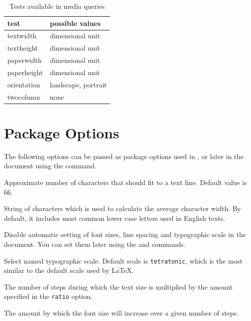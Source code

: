 \documentclass{ltxdoc}
\begin{document}
\begin{table}[htbp]
  \centering
  \begin{tabular}{ll}
    \toprule
    test & possible values \\
    \midrule
    textwidth & dimensional unit \\
    textheight & dimensional unit \\
    paperwidth & dimensional unit\\
    paperheight & dimensional unit\\
    orientation & landscape, portrait\\
    twocolumn & none \\
    \bottomrule
  \end{tabular}
  \caption{Tests available in media queries}\label{tbl:mediaqueries}
\end{table}




\section{Package Options}

The following options can be passed as package options used in \cmd{\usepackage}, 
or later in the document using the \cmd{\ResponsiveSetup} command.

\medskip

\noindent {} Approximate number of characters that should fit to a text line. Default value is 66.

\noindent {} String of characters which is used to calculate the average character width. By default, it includes most common lower case letters used in English texts.

\noindent {}  Disable automatic setting of font sizes, line spacing and typographic scale in the document. You can set them 
later using the \cmd{\setsizes} and \cmd{\ResponsiveSetup} commands.

\noindent {} Select named typographic scale. Default scale is
\texttt{tetratonic}, which is the most similar to the default scale used by
\LaTeX.

\noindent {} The number of steps during which the text size is multiplied by the amount specified in the \texttt{ratio} option.

\noindent {} The amount by which the font size will increase over a given number of steps.
\end{document}

